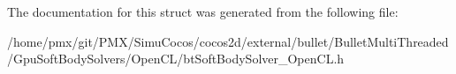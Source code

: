 The documentation for this struct was generated from the following file\+:\begin{DoxyCompactItemize}
\item 
/home/pmx/git/\+P\+M\+X/\+Simu\+Cocos/cocos2d/external/bullet/\+Bullet\+Multi\+Threaded/\+Gpu\+Soft\+Body\+Solvers/\+Open\+C\+L/bt\+Soft\+Body\+Solver\+\_\+\+Open\+C\+L.\+h\end{DoxyCompactItemize}
